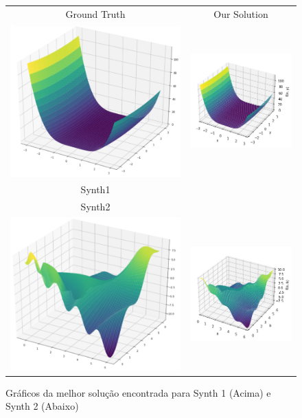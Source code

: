 \documentclass[10pt,twocolumn,letterpaper]{article}
\begin{document}
\begin{figure}[H]
   \begin{tabular}{cc}
   Ground Truth & Our Solution \\
   \includegraphics[width=.5\linewidth]{synth1_ground.png} & \includegraphics[width=.5\linewidth]{synth1_plot.png}\\

   Synth1  \\
   \hline
   Synth2  \\
   \includegraphics[width=.5\linewidth]{synth2_ground.png} & \includegraphics[width=.5\linewidth]{synth2_plot.png}
   \end{tabular}
      \caption{Gráficos da melhor solução encontrada para Synth 1 (Acima) e Synth 2 (Abaixo)}
      \label{fig:surfaces}
\end{figure}
\end{document}
